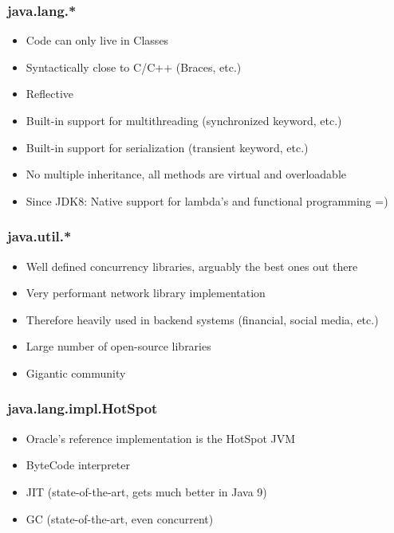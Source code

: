 \begin{frame}
  \frametitle{java.lang.*}

 \begin{itemize}
    \item Code can only live in Classes
    \vspace{0.3cm}
    \item Syntactically close to C/C++ (Braces, etc.)
    \vspace{0.3cm}
    \item Reflective
    \vspace{0.3cm}
    \item Built-in support for multithreading (synchronized keyword, etc.)
    \vspace{0.3cm}
    \item Built-in support for serialization (transient keyword, etc.)
    \vspace{0.3cm}
    \item No multiple inheritance, all methods are virtual and overloadable
    \vspace{0.3cm}
    \item Since JDK8: Native support for lambda's and functional programming =)
  \end{itemize}  
  
\end{frame}


\begin{frame}
  \frametitle{java.util.*}

 \begin{itemize}
    \item Well defined concurrency libraries, arguably the best ones out there
    \vspace{0.3cm}
    \item Very performant network library implementation
    \vspace{0.3cm}  
    \item Therefore heavily used in backend systems (financial, social media, etc.)
    \vspace{0.3cm}
    \item Large number of open-source libraries
    \vspace{0.3cm}
    \item Gigantic community
  \end{itemize}  
  
\end{frame}


\begin{frame}
  \frametitle{java.lang.impl.HotSpot}
  \begin{itemize}
    \item Oracle's reference implementation is the HotSpot JVM
    \vspace{0.3cm}
    \item ByteCode interpreter
    \vspace{0.3cm}    
    \item JIT	(state-of-the-art, gets much better in Java 9)
    \vspace{0.3cm}    
    \item GC 	(state-of-the-art, even concurrent)    
  \end{itemize}
\end{frame}


